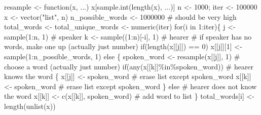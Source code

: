 \documentclass[
  a4paper,
  DIV=11,
  numbers=noendperiod,
  oneside]{scrreprt}
\newenvironment{Shaded}{}{}
\newcommand{\CommentTok}[1]{\textcolor[rgb]{0.42,0.45,0.49}{#1}}
\newcommand{\ControlFlowTok}[1]{\textcolor[rgb]{0.84,0.23,0.29}{#1}}
\newcommand{\DecValTok}[1]{\textcolor[rgb]{0.00,0.36,0.77}{#1}}
\newcommand{\FunctionTok}[1]{\textcolor[rgb]{0.44,0.26,0.76}{#1}}
\newcommand{\NormalTok}[1]{\textcolor[rgb]{0.14,0.16,0.18}{#1}}
\newcommand{\OtherTok}[1]{\textcolor[rgb]{0.44,0.26,0.76}{#1}}
\newcommand{\SpecialCharTok}[1]{\textcolor[rgb]{0.00,0.36,0.77}{#1}}
\newcommand{\StringTok}[1]{\textcolor[rgb]{0.01,0.18,0.38}{#1}}
\begin{document}
\begin{Shaded}
\begin{Highlighting}[]
\NormalTok{resample }\OtherTok{\textless{}{-}} \ControlFlowTok{function}\NormalTok{(x, ...) x[}\FunctionTok{sample.int}\NormalTok{(}\FunctionTok{length}\NormalTok{(x), ...)]}
\NormalTok{n }\OtherTok{\textless{}{-}} \DecValTok{1000}\NormalTok{; iter }\OtherTok{\textless{}{-}} \DecValTok{100000}
\NormalTok{x }\OtherTok{\textless{}{-}} \FunctionTok{vector}\NormalTok{(}\StringTok{"list"}\NormalTok{, n)}
\NormalTok{n\_possible\_words }\OtherTok{\textless{}{-}} \DecValTok{1000000} \CommentTok{\# should be very high}
\NormalTok{total\_words }\OtherTok{\textless{}{-}}\NormalTok{ total\_unique\_words }\OtherTok{\textless{}{-}} \FunctionTok{numeric}\NormalTok{(iter)}
\ControlFlowTok{for}\NormalTok{(i }\ControlFlowTok{in} \DecValTok{1}\SpecialCharTok{:}\NormalTok{iter)\{}
\NormalTok{  j }\OtherTok{\textless{}{-}} \FunctionTok{sample}\NormalTok{(}\DecValTok{1}\SpecialCharTok{:}\NormalTok{n, }\DecValTok{1}\NormalTok{) }\CommentTok{\# speaker}
\NormalTok{  k }\OtherTok{\textless{}{-}} \FunctionTok{sample}\NormalTok{((}\DecValTok{1}\SpecialCharTok{:}\NormalTok{n)[}\SpecialCharTok{{-}}\NormalTok{i], }\DecValTok{1}\NormalTok{) }\CommentTok{\# hearer}
  \CommentTok{\# if speaker has no words, make one up (actually just number)}
  \ControlFlowTok{if}\NormalTok{(}\FunctionTok{length}\NormalTok{(x[[j]]) }\SpecialCharTok{==} \DecValTok{0}\NormalTok{) x[[j]][}\DecValTok{1}\NormalTok{] }\OtherTok{\textless{}{-}} \FunctionTok{sample}\NormalTok{(}\DecValTok{1}\SpecialCharTok{:}\NormalTok{n\_possible\_words, }\DecValTok{1}\NormalTok{) }\ControlFlowTok{else} 
\NormalTok{  \{}
\NormalTok{    spoken\_word }\OtherTok{\textless{}{-}} \FunctionTok{resample}\NormalTok{(x[[j]], }\DecValTok{1}\NormalTok{) }\CommentTok{\# choose a word (actually just number)}
    \ControlFlowTok{if}\NormalTok{(}\FunctionTok{any}\NormalTok{(x[[k]]}\SpecialCharTok{\%in\%}\NormalTok{spoken\_word)) }\CommentTok{\# hearer knows the word}
\NormalTok{    \{}
\NormalTok{      x[[j]] }\OtherTok{\textless{}{-}}\NormalTok{ spoken\_word }\CommentTok{\# erase list except spoken\_word}
\NormalTok{      x[[k]] }\OtherTok{\textless{}{-}}\NormalTok{ spoken\_word }\CommentTok{\# erase list except spoken\_word}
\NormalTok{    \} }\ControlFlowTok{else} \CommentTok{\# hearer does not know the word}
\NormalTok{      x[[k]] }\OtherTok{\textless{}{-}} \FunctionTok{c}\NormalTok{(x[[k]], spoken\_word)  }\CommentTok{\# add word to list}
\NormalTok{  \} }
\NormalTok{  total\_words[i] }\OtherTok{\textless{}{-}} \FunctionTok{length}\NormalTok{(}\FunctionTok{unlist}\NormalTok{(x))}

\end{Highlighting}
\end{Shaded}
\end{document}

